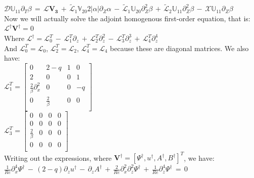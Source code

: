 \documentclass[letterpaper,12pt]{article}
\newcommand\reye{\mathrel{Re}}
\begin{document}
$\mathcal{D}\mathbb{U}_{11} \partial_T \beta \, = \, \mathcal{L}\mathbf{V_3} \, + \, \widetilde{\mathcal{L}}_1 \mathbb{V}_{20} 2 \left|\alpha\right| \partial_Z \alpha \, - \, \widetilde{\mathcal{L}}_1 \mathbb{U}_{20} \partial_Z^2 \beta \, + \, \widetilde{\mathcal{L}}_2 \mathbb{U}_{11} \partial_Z^2 \beta \, - \, \mathcal{X} \mathbb{U}_{11} \partial_Z \beta \, $\\

Now we will actually solve the adjoint homogenous first-order equation, that is: \\

$\mathcal{L}^\dagger \mathbf{V}^\dagger = 0$ \\ 

Where $\mathcal{L}^\dagger = \mathcal{L}_0^T \, - \, \mathcal{L}_1^T \partial_z \, + \, \mathcal{L}_2^T\partial_z^2 \, - \, \mathcal{L}_3^T \partial_z^3 \, + \, \mathcal{L}_4^T \partial_z^4$ \\

And $\mathcal{L}_0^T = \mathcal{L}_0$, $\mathcal{L}_2^T = \mathcal{L}_2$, $\mathcal{L}_4^T = \mathcal{L}_4$ because these are diagonal matrices. We also have:\\

$\mathcal{L}_1^T = \left[\begin{matrix}
0 & 2-q & 1 & 0 \\
2 & 0 & 0 & 1 \\
\frac{2}{\beta} \partial_x^2 & 0 & 0 & -q\\
0 & \frac{2}{\beta} & 0 & 0 \\
\end{matrix}\right]$ \\

$\mathcal{L}_3^T = \left[\begin{matrix}
0 & 0 & 0 & 0 \\
0 & 0 & 0 & 0 \\
\frac{2}{\beta} & 0 & 0 & 0\\
0 & 0 & 0 & 0 \\
\end{matrix}\right]$ \\

Writing out the expressions, where $\mathbf{V}^\dagger = \left[\Psi^\dagger, u^\dagger, A^\dagger, B^\dagger\right]^T$, we have: \\

$\frac{1}{\reye}\partial_x^4 \Psi^\dagger \, - \, (2-q)\partial_z u^\dagger \, - \, \partial_z A^\dagger \, + \, \frac{2}{\reye}\partial_x^2 \partial_z^2 \Psi^\dagger \, + \, \frac{1}{\reye}\partial_z^4 \Psi^\dagger \, = \, 0$ \\
\end{document}
